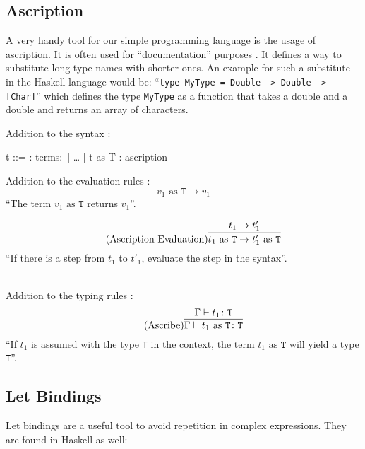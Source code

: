 \subsection{Ascription}

A very handy tool for our simple programming language is the usage of ascription.
It is often used for ``documentation'' purposes \cite{pierce2002ProgLang}. It defines
a way to substitute long type names with shorter ones. An example for such a substitute
in the Haskell language would be: ``\texttt{type MyType = Double -> Double -> [Char]}''
which defines the type \texttt{MyType} as a function that takes a double and a double
and returns an array of characters.

Addition to the syntax \cite{pierce2002ProgLang}:
\begin{bnfgrammar}
    t ::= : terms$\colon$
    | \dots
    | t as T : ascription
\end{bnfgrammar}\leavevmode\newline

Addition to the evaluation rules \cite{pierce2002ProgLang}:
\begin{equation*}
    \tag{Ascribe Value}
    v_1 \text{ as } \texttt{T} \rightarrow v_1
\end{equation*}
``The term $v_1 \text{ as } \texttt{T}$ returns $v_1$''.

\begin{equation*}
    \tag{Ascription Evaluation}
    \infer{
        t_1 \text{ as } \texttt{T} \rightarrow t'_1 \text{ as } \texttt{T}
    }{
        t_1 \rightarrow t'_1
    }
\end{equation*}
``If there is a step from $t_1$ to $t'_1$, evaluate the step
in the syntax''.

~\\
Addition to the typing rules \cite{pierce2002ProgLang}:
\begin{equation*}
    \tag{Ascribe}
    \infer{
        \Gamma \vdash t_1 \text{ as } \texttt{T} \colon \texttt{T}
    }{
        \Gamma \vdash t_1 \colon \texttt{T}
    }
\end{equation*}
``If $t_1$ is assumed with the type \texttt{T} in the context,
the term $t_1 \text{ as } \texttt{T}$ will yield a type \texttt{T}''.

\subsection{Let Bindings}

Let bindings are a useful tool to avoid repetition in complex expressions.
They are found in Haskell as well:

